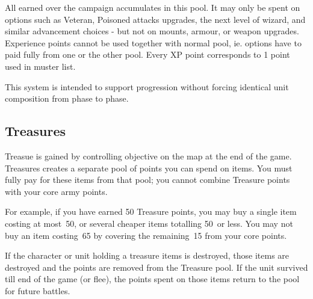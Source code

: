 All \XPshort{} earned over the campaign accumulates in this pool. It may only be spent on
options such as Veteran, Poisoned attacks upgrades, the next level of wizard, and similar advancement choices - but not on mounts, armour, or weapon upgrades. Experience points cannot be used together with normal pool, ie. options have to paid fully from one or the other pool.
Every XP point corresponds to 1 point used in muster list.

This system is intended to support progression without forcing identical unit composition
from phase to phase.

\subsection{Treasures}
Treasue is gained by controlling objective on the map at the end of the game.
Treasures creates a separate pool of points you can spend on items. 
You must fully pay for these items from that pool; you cannot combine Treasure points with your core army points.

For example, if you have earned 50 Treasure points, you may buy a single item costing at most~50, or several cheaper items totalling 50~or less. 
You may not buy an item costing~65 by covering the remaining~15 from your core points.

If the character or unit holding a treasure items is destroyed, those items are destroyed and the points are removed from the Treasure pool. 
If the unit survived till end of the game (or flee), the points spent on those items return to the pool for future battles.

